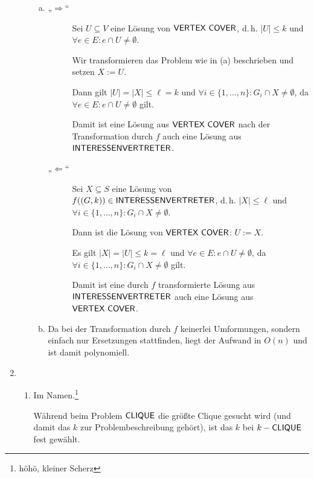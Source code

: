 \begin{enumerate}
\begin{enumerate}[1.]
\begin{enumerate}[(a)]
        \item \begin{description}
          \item[„$\Rightarrow$“] Sei $U \subseteq V$ eine Lösung von $\textsf{VERTEX COVER}$,
            d.\,h. $|U| \leq k$ und $\forall e \in E: e \cap U \neq \emptyset$.

            Wir transformieren das Problem wie in (a) beschrieben und setzen
            $X := U$.

            Dann gilt $|U| = |X| \leq \ell = k$ und
            $\forall i \in \{1, \ldots, n\}: G_i \cap X \neq \emptyset$,
            da $\forall e \in E: e \cap U \neq \emptyset$ gilt.

            Damit ist eine Lösung aus $\textsf{VERTEX COVER}$ nach der Transformation durch $f$
            auch eine Lösung aus\\ $\textsf{INTERESSENVERTRETER}$.

          \item[„$\Leftarrow$“] Sei $X \subseteq S$ eine Lösung von
            $f((G,k)) \in \textsf{INTERESSENVERTRETER}$, d.\,h. $|X| \leq \ell$ und
            $\forall i \in \{1, \ldots, n\}: G_i \cap X \neq \emptyset$.

            Dann ist die Lösung von $\textsf{VERTEX COVER}$: $U := X$.

            Es gilt $|X| = |U| \leq k = \ell$ und
            $\forall e \in E: e \cap U \neq \emptyset$,
            da $\forall i \in \{1, \ldots, n\}: G_i \cap X \neq \emptyset$ gilt.

            Damit ist eine durch $f$ transformierte Lösung aus $\textsf{INTERESSENVERTRETER}$ auch eine
            Lösung aus $\textsf{VERTEX COVER}$.
        \end{description}

        \item Da bei der Transformation durch $f$ keinerlei Umformungen, sondern
          einfach nur Ersetzungen stattfinden, liegt der Aufwand in $O(n)$ und
          ist damit polynomiell.
      \end{enumerate}
    \end{enumerate}

    \item \begin{enumerate}
      \item Im Namen.\footnote{höhö, kleiner Scherz}

        Während beim Problem $\textsf{CLIQUE}$ die größte Clique gesucht wird (und damit
        das $k$ zur Problembeschreibung gehört), ist das $k$ bei $k-\textsf{CLIQUE}$
        fest gewählt.


\end{enumerate}
\end{enumerate}
